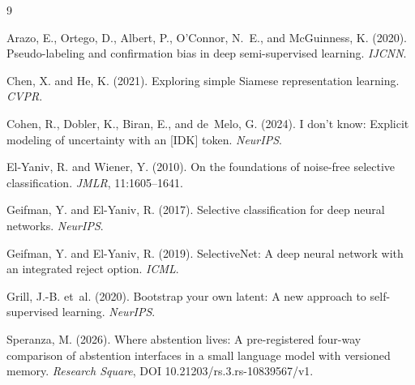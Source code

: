 \documentclass[11pt]{article}
\begin{document}

\begin{thebibliography}{9}

Arazo, E., Ortego, D., Albert, P., O'Connor, N.~E., and McGuinness, K. (2020).
Pseudo-labeling and confirmation bias in deep semi-supervised learning.
\emph{IJCNN}.

Chen, X. and He, K. (2021).
Exploring simple Siamese representation learning.
\emph{CVPR}.

Cohen, R., Dobler, K., Biran, E., and de~Melo, G. (2024).
I don't know: Explicit modeling of uncertainty with an [IDK] token.
\emph{NeurIPS}.

El-Yaniv, R. and Wiener, Y. (2010).
On the foundations of noise-free selective classification.
\emph{JMLR}, 11:1605--1641.

Geifman, Y. and El-Yaniv, R. (2017).
Selective classification for deep neural networks.
\emph{NeurIPS}.

Geifman, Y. and El-Yaniv, R. (2019).
SelectiveNet: A deep neural network with an integrated reject option.
\emph{ICML}.

Grill, J.-B. et~al. (2020).
Bootstrap your own latent: A new approach to self-supervised learning.
\emph{NeurIPS}.

Speranza, M. (2026).
Where abstention lives: A pre-registered four-way comparison of abstention interfaces in a small
language model with versioned memory.
\emph{Research Square}, DOI 10.21203/rs.3.rs-10839567/v1.

\end{thebibliography}
\end{document}
